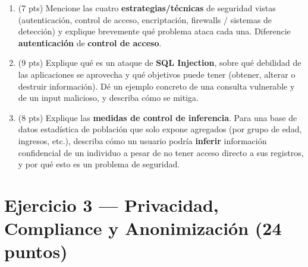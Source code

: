 \documentclass[11pt,a4paper]{article}
\begin{document}
\begin{enumerate}
  \item (7 pts) Mencione las cuatro \textbf{estrategias/técnicas} de seguridad vistas (autenticación, control de acceso, encriptación, firewalls / sistemas de detección) y explique brevemente qué problema ataca cada una. Diferencie \textbf{autenticación} de \textbf{control de acceso}.

  \vspace{4.5cm}

  \item (9 pts) Explique qué es un ataque de \textbf{SQL Injection}, sobre qué debilidad de las aplicaciones se aprovecha y qué objetivos puede tener (obtener, alterar o destruir información). Dé un ejemplo concreto de una consulta vulnerable y de un input malicioso, y describa cómo se mitiga.

  \vspace{6cm}

  \item (8 pts) Explique las \textbf{medidas de control de inferencia}. Para una base de datos estadística de población que solo expone agregados (por grupo de edad, ingresos, etc.), describa cómo un usuario podría \textbf{inferir} información confidencial de un individuo a pesar de no tener acceso directo a sus registros, y por qué esto es un problema de seguridad.

  \vspace{5cm}
\end{enumerate}

\newpage

\section*{Ejercicio 3 — Privacidad, Compliance y Anonimización \hfill\normalfont(24 puntos)}
\end{document}

